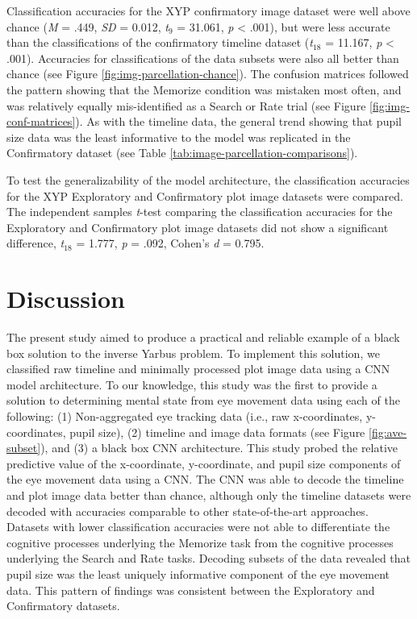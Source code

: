 \documentclass[
  english,
  man, donotrepeattitle,floatsintext]{apa6}
\begin{document}
Classification accuracies for the XYP confirmatory image dataset were well above chance (\emph{M} = .449, \emph{SD} = 0.012, \emph{t}\(_{9}\) = 31.061, \emph{p} \textless{} .001), but were less accurate than the classifications of the confirmatory timeline dataset (\emph{t}\(_{18}\) = 11.167, \emph{p} \textless{} .001). Accuracies for classifications of the data subsets were also all better than chance (see Figure \ref{fig:img-parcellation-chance}). The confusion matrices followed the pattern showing that the Memorize condition was mistaken most often, and was relatively equally mis-identified as a Search or Rate trial (see Figure \ref{fig:img-conf-matrices}). As with the timeline data, the general trend showing that pupil size data was the least informative to the model was replicated in the Confirmatory dataset (see Table \ref{tab:image-parcellation-comparisons}).

To test the generalizability of the model architecture, the classification accuracies for the XYP Exploratory and Confirmatory plot image datasets were compared. The independent samples \emph{t}-test comparing the classification accuracies for the Exploratory and Confirmatory plot image datasets did not show a significant difference, \emph{t}\(_{18}\) = 1.777, \emph{p} = .092, Cohen's \emph{d} = 0.795.

\section{Discussion}

The present study aimed to produce a practical and reliable example of a black box solution to the inverse Yarbus problem. To implement this solution, we classified raw timeline and minimally processed plot image data using a CNN model architecture. To our knowledge, this study was the first to provide a solution to determining mental state from eye movement data using each of the following: (1) Non-aggregated eye tracking data (i.e., raw x-coordinates, y-coordinates, pupil size), (2) timeline and image data formats (see Figure \ref{fig:ave-subset}), and (3) a black box CNN architecture. This study probed the relative predictive value of the x-coordinate, y-coordinate, and pupil size components of the eye movement data using a CNN. The CNN was able to decode the timeline and plot image data better than chance, although only the timeline datasets were decoded with accuracies comparable to other state-of-the-art approaches. Datasets with lower classification accuracies were not able to differentiate the cognitive processes underlying the Memorize task from the cognitive processes underlying the Search and Rate tasks. Decoding subsets of the data revealed that pupil size was the least uniquely informative component of the eye movement data. This pattern of findings was consistent between the Exploratory and Confirmatory datasets.
\end{document}
